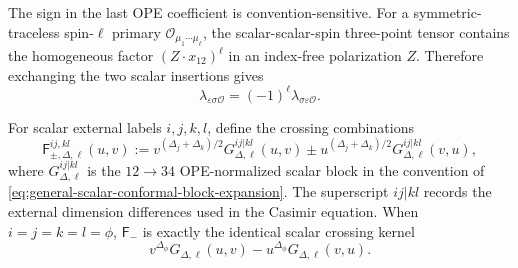 The sign in the last OPE coefficient is convention-sensitive.  For a
symmetric-traceless spin-\(\ell\) primary \(\mathcal O_{\mu_1\cdots\mu_\ell}\),
the scalar-scalar-spin three-point tensor contains the homogeneous factor
\((Z\cdot x_{12})^\ell\) in an index-free polarization \(Z\).  Therefore
exchanging the two scalar insertions gives
\begin{equation}
  \lambda_{\varepsilon\sigma\mathcal O}
  =
  (-1)^\ell\lambda_{\sigma\varepsilon\mathcal O}.
  \label{eq:mixed-scalar-spin-exchange-sign}
\end{equation}

For scalar external labels \(i,j,k,l\), define the crossing combinations
\begin{equation}
  \mathsf F_{\pm,\Delta,\ell}^{ij,kl}(u,v)
  :=
  v^{(\Delta_j+\Delta_k)/2}
  G_{\Delta,\ell}^{ij|kl}(u,v)
  \pm
  u^{(\Delta_j+\Delta_k)/2}
  G_{\Delta,\ell}^{ij|kl}(v,u),
  \label{eq:mixed-bootstrap-fpm-definition}
\end{equation}
where \(G_{\Delta,\ell}^{ij|kl}\) is the \(12\to34\) OPE-normalized scalar
block in the convention of
\eqref{eq:general-scalar-conformal-block-expansion}.  The superscript
\(ij|kl\) records the external dimension differences used in the Casimir
equation.  When \(i=j=k=l=\phi\), \(\mathsf F_-\) is exactly the identical
scalar crossing kernel
\[
  v^{\Delta_\phi}G_{\Delta,\ell}(u,v)
  -
  u^{\Delta_\phi}G_{\Delta,\ell}(v,u).
\]

